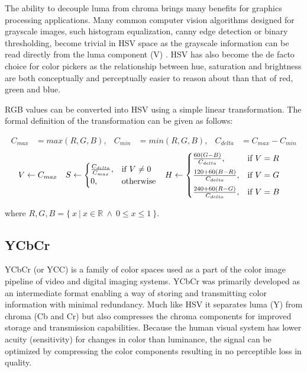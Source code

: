 \documentclass[thesis.tex]{subfiles}
\begin{document}
The ability to decouple luma from chroma brings many benefits for graphics processing applications. Many common computer vision algorithms designed for grayscale images, such histogram equalization, canny edge detection or binary thresholding, become trivial in HSV space as the grayscale information can be read directly from the luma component (V) \cite{color_segmentation}. HSV has also become the de facto choice for color pickers as the relationship between hue, saturation and brightness are both conceptually and perceptually easier to reason about than that of red, green and blue.

RGB values can be converted into HSV using a simple linear transformation. The formal definition of the transformation can be given as follows:

\begin{align*}
C_{max}&=max(R, G, B),	&	C_{min}&=min(R, G, B),	&	C_{delta}&=C_{max}-C_{min}
\end{align*}
\begin{align*}
V &\leftarrow C_{max}	&
S &\leftarrow
	\begin{cases}
		\frac{C_{delta}}{C_{max}}, & \text{if $V\neq0$}\\
		0, & \text{otherwise}
	\end{cases}			&
H &\leftarrow
	\begin{cases}
		\frac{60(G-B)}{C_{delta}}, & \text{if $V=R$}\vspace{2mm}\\
		\frac{120+60(B-R)}{C_{delta}}, & \text{if $V=G$}\vspace{2mm}\\
		\frac{240+60(R-G)}{C_{delta}}, & \text{if $V=B$}
	\end{cases}
\end{align*}

\noindent where $R, G, B = \{\ x\ \vert\ x \in \mathbb R\ \wedge\ 0 \leq x \leq 1\ \}$.

\subsection{YCbCr}
YCbCr (or YCC) is a family of color spaces used as a part of the color image pipeline of video and digital imaging systems. YCbCr was primarily developed as an intermediate format enabling a way of storing and transmitting color information with minimal redundancy. Much like HSV it separates luma (Y) from chroma (Cb and Cr) but also compresses the chroma components for improved storage and transmission capabilities. Because the human visual system has lower acuity (sensitivity) for changes in color than luminance, the signal can be optimized by compressing the color components resulting in no perceptible loss in quality. \cite{color_vision}
\end{document}
